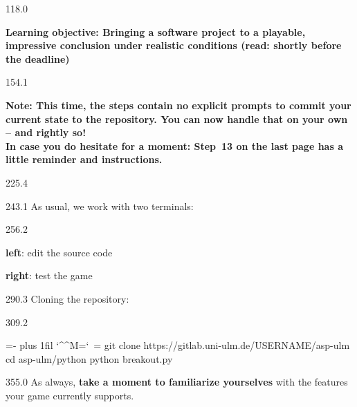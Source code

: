 \documentclass{aslab}
\makeatletter
\newenvironment{pycode}{\par\ttfamily\hyphenchar\font=-1
  \lineskiplimit=-\maxdimen\lineskip=0pt\parindent=0pt
  \parfillskip=0pt plus 1fil\relax
  \catcode`\^^M=\active\catcode`\ =\active\py@setup\py@gobble}{}
\makeatother
\begin{document}
\maketitleblock

\begin{region}[pitch=15.5]{118.0}
{\bfseries\color{aslabblue}Learning objective: Bringing a software project to a
playable, impressive conclusion under realistic conditions (read: shortly
before the deadline)\par}
\end{region}

\begin{region}[pitch=14.27]{154.1}
{\bfseries\color{aslabblue}Note: This time, the steps contain no explicit
prompts to commit your current state to the repository. You can now handle
that on your own -- and rightly so!\\
In case you do hesitate for a moment: Step~13 on the last page has a little
reminder and instructions.\par}
\end{region}

\begin{region}{225.4}
\end{region}

\begin{region}{243.1}
As usual, we work with two terminals:
\end{region}

\begin{region}[pitch=14.3]{256.2}
\begin{dashlist}
\item \textbf{left}: edit the source code
\item \textbf{right}: test the game
\end{dashlist}
\end{region}

\begin{region}{290.3}
Cloning the repository:
\end{region}

\begin{region}[pitch=13.2]{309.2}
\begin{pycode}
git clone https://gitlab.uni-ulm.de/USERNAME/asp-ulm
cd asp-ulm/python
python breakout.py
\end{pycode}
\end{region}

\begin{region}{355.0}
As always, \textbf{take a moment to familiarize yourselves} with the features
your game currently supports.
\end{region}
\end{document}
